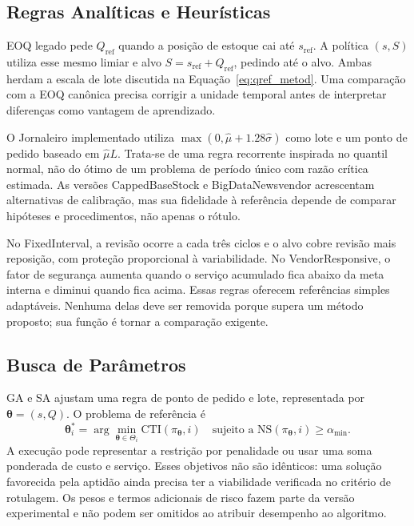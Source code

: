 \subsection{Regras Analíticas e Heurísticas}

EOQ legado pede $Q_{\mathrm{ref}}$ quando a posição de estoque cai até $s_{\mathrm{ref}}$. A política $(s,S)$ utiliza esse mesmo limiar e alvo $S=s_{\mathrm{ref}}+Q_{\mathrm{ref}}$, pedindo até o alvo. Ambas herdam a escala de lote discutida na Equação~\ref{eq:qref_metod}. Uma comparação com a EOQ canônica precisa corrigir a unidade temporal antes de interpretar diferenças como vantagem de aprendizado.

O Jornaleiro implementado utiliza $\max(0,\hat\mu+1.28\hat\sigma)$ como lote e um ponto de pedido baseado em $\hat\mu L$. Trata-se de uma regra recorrente inspirada no quantil normal, não do ótimo de um problema de período único com razão crítica estimada. As versões CappedBaseStock e BigDataNewsvendor acrescentam alternativas de calibração, mas sua fidelidade à referência depende de comparar hipóteses e procedimentos, não apenas o rótulo.

No FixedInterval, a revisão ocorre a cada três ciclos e o alvo cobre revisão mais reposição, com proteção proporcional à variabilidade. No VendorResponsive, o fator de segurança aumenta quando o serviço acumulado fica abaixo da meta interna e diminui quando fica acima. Essas regras oferecem referências simples adaptáveis. Nenhuma delas deve ser removida porque supera um método proposto; sua função é tornar a comparação exigente.

\subsection{Busca de Parâmetros}

GA e SA ajustam uma regra de ponto de pedido e lote, representada por $\boldsymbol\theta=(s,Q)$. O problema de referência é
\begin{equation}
\boldsymbol\theta_i^*=\arg\min_{\boldsymbol\theta\in\Theta_i}\mathrm{CTI}(\pi_{\boldsymbol\theta},i)
\quad\text{sujeito a }\mathrm{NS}(\pi_{\boldsymbol\theta},i)\geq\alpha_{\min}.
\label{eq:obj_metaheuristicas}
\end{equation}
A execução pode representar a restrição por penalidade ou usar uma soma ponderada de custo e serviço. Esses objetivos não são idênticos: uma solução favorecida pela aptidão ainda precisa ter a viabilidade verificada no critério de rotulagem. Os pesos e termos adicionais de risco fazem parte da versão experimental e não podem ser omitidos ao atribuir desempenho ao algoritmo.

